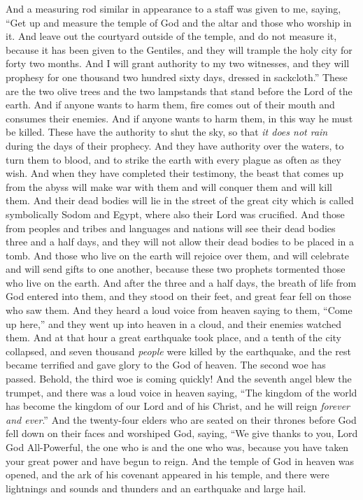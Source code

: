 \begin{biblechapter} %
 And a measuring rod similar in appearance to a staff was given to me, saying, “Get up and measure the temple of God and the altar and those who worship in it.
\verse And leave out the courtyard outside of the temple, and do not measure it, because it has been given to the Gentiles, and they will trample the holy city for forty two months.
\verse And I will grant authority to my two witnesses, and they will prophesy for one thousand two hundred sixty days, dressed in sackcloth.”
\verse These are the two olive trees and the two lampstands that stand before the Lord of the earth.
\verse And if anyone wants to harm them, fire comes out of their mouth and consumes their enemies. And if anyone wants to harm them, in this way he must be killed.
\verse These have the authority to shut the sky, so that \textit{it does not rain} during the days of their prophecy. And they have authority over the waters, to turn them to blood, and to strike the earth with every plague as often as they wish.
\verse And when they have completed their testimony, the beast that comes up from the abyss will make war with them and will conquer them and will kill them.
\verse And their dead bodies will lie in the street of the great city which is called symbolically Sodom and Egypt, where also their Lord was crucified.
\verse And those from peoples and tribes and languages and nations will see their dead bodies three and a half days, and they will not allow their dead bodies to be placed in a tomb.
\verse And those who live on the earth will rejoice over them, and will celebrate and will send gifts to one another, because these two prophets tormented those who live on the earth.
\verse And after the three and a half days, the breath of life from God entered into them, and they stood on their feet, and great fear fell on those who saw them.
\verse And they heard a loud voice from heaven saying to them, “Come up here,” and they went up into heaven in a cloud, and their enemies watched them.
\verse And at that hour a great earthquake took place, and a tenth of the city collapsed, and seven thousand \textit{people} were killed by the earthquake, and the rest became terrified and gave glory to the God of heaven.
\verse The second woe has passed. Behold, the third woe is coming quickly!
 And the seventh angel blew the trumpet, and there was a loud voice in heaven saying, “The kingdom of the world has become the kingdom of our Lord 
and of his Christ, 
and he will reign \textit{forever and ever}.”
\verse And the twenty-four elders who are seated on their thrones before God fell down on their faces and worshiped God,
\verse saying,
\verse “We give thanks to you, Lord God All-Powerful, 
the one who is and the one who was, 
because you have taken your great power 
and have begun to reign.
\verse And the temple of God in heaven was opened, and the ark of his covenant appeared in his temple, and there were lightnings and sounds and thunders and an earthquake and large hail.
\end{biblechapter}

